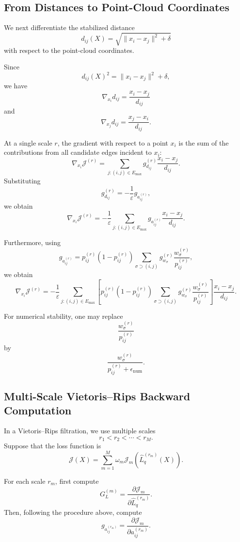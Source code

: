 \documentclass[pdflatex,sn-mathphys-ay]{sn-jnl}%
\theoremstyle{thmstyleone}%
\theoremstyle{thmstyletwo}%
\theoremstyle{thmstylethree}%
\begin{document}
\begin{appendices}
\subsection{From Distances to Point-Cloud Coordinates}

We next differentiate the stabilized distance
\[
d_{ij}(X)
=
\sqrt{
\|x_i-x_j\|^2+\delta
}
\]
with respect to the point-cloud coordinates.

Since
\[
d_{ij}(X)^2
=
\|x_i-x_j\|^2+\delta,
\]
we have
\[
\nabla_{x_i}d_{ij}
=
\frac{x_i-x_j}{d_{ij}}
\]
and
\[
\nabla_{x_j}d_{ij}
=
\frac{x_j-x_i}{d_{ij}}.
\]

At a single scale \(r\), the gradient with respect to a point \(x_i\) is the sum of the contributions from all candidate edges incident to \(x_i\):
\[
\nabla_{x_i}\mathcal{J}^{(r)}
=
\sum_{j:(i,j)\in E_{\max}}
g_{d_{ij}}^{(r)}
\frac{x_i-x_j}{d_{ij}}.
\]
Substituting
\[
g_{d_{ij}}^{(r)}
=
-\frac{1}{\varepsilon}
g_{a_{ij}^{(r)}},
\]
we obtain
\[
\nabla_{x_i}\mathcal{J}^{(r)}
=
-\frac{1}{\varepsilon}
\sum_{j:(i,j)\in E_{\max}}
g_{a_{ij}^{(r)}}
\frac{x_i-x_j}{d_{ij}}.
\]

Furthermore, using
\[
g_{a_{ij}^{(r)}}
=
p_{ij}^{(r)}
\left(
1-p_{ij}^{(r)}
\right)
\sum_{\sigma\supset(i,j)}
g_{w_\sigma}^{(r)}
\frac{
w_\sigma^{(r)}
}{
p_{ij}^{(r)}
},
\]
we obtain
\[
\nabla_{x_i}\mathcal{J}^{(r)}
=
-\frac{1}{\varepsilon}
\sum_{j:(i,j)\in E_{\max}}
\left[
p_{ij}^{(r)}
\left(
1-p_{ij}^{(r)}
\right)
\sum_{\sigma\supset(i,j)}
g_{w_\sigma}^{(r)}
\frac{
w_\sigma^{(r)}
}{
p_{ij}^{(r)}
}
\right]
\frac{x_i-x_j}{d_{ij}}.
\]

For numerical stability, one may replace
\[
\frac{
w_\sigma^{(r)}
}{
p_{ij}^{(r)}
}
\]
by
\[
\frac{
w_\sigma^{(r)}
}{
p_{ij}^{(r)}+\epsilon_{\mathrm{num}}
}.
\]

\subsection{Multi-Scale Vietoris--Rips Backward Computation}

In a Vietoris--Rips filtration, we use multiple scales
\[
r_1<r_2<\cdots<r_M.
\]
Suppose that the loss function is
\[
\mathcal{J}(X)
=
\sum_{m=1}^{M}
\omega_m
\mathcal{J}_m
\left(
\widehat{L}_q^{(r_m)}(X)
\right).
\]

For each scale \(r_m\), first compute
\[
G_L^{(m)}
=
\frac{\partial\mathcal{J}_m}
{\partial \widehat{L}_q^{(r_m)}}.
\]
Then, following the procedure above, compute
\[
g_{a_{ij}^{(r_m)}}
=
\frac{\partial\mathcal{J}_m}
{\partial a_{ij}^{(r_m)}}.
\]


\end{appendices}
\end{document}
